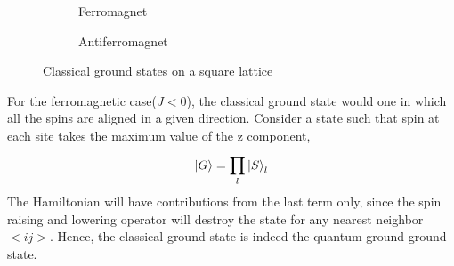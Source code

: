 \begin{figure}
        \begin{subfigure}[b]{0.5\textwidth}
                \centering
                \caption{Ferromagnet}
        \end{subfigure}%
        \begin{subfigure}[b]{0.5\textwidth}
                \centering
                \caption{Antiferromagnet}
        \end{subfigure}%
        \caption{Classical ground states on a square lattice}\label{fig:square_lattice}
\end{figure}


For the ferromagnetic case($ J < 0 $), the classical ground state would one in which all the spins are aligned in a given direction. Consider a state such that spin at each site takes the maximum value of the z component,
\begin{equation}\label{eq22}
\ket{G} = \prod_{l}^{}\ket{S}_l
\end{equation} 
The Hamiltonian will have contributions from the last term only, since the spin raising and lowering operator will destroy the state for any nearest neighbor $ <ij> $. Hence, the classical ground state is indeed the quantum ground ground state.


